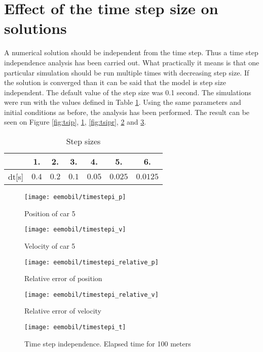 		\section{Effect of the time step size on solutions}
		A numerical solution should be independent from the time step. Thus a time step independence analysis has been carried out. What practically it means is that one particular simulation should be run multiple times with decreasing step size. If the solution is converged than it can be said that the model is step size independent. The default value of the step size was 0.1 second. The simulations were run with the values defined in Table \ref{tab:timestepsizes}.
		Using the same parameters and initial conditions as before, the analysis has been performed. The result can be seen on Figure \ref{fig:tsip}, \ref{fig:tsiv}, \ref{fig:tsipr}, \ref{fig:tsivr} and \ref{fig:tsit}.
		\begin{table}[ht]
			\begin{center}
				\begin{tabular}{ |c||c|c|c|c|c|c|}
					\hline
					&1. & 2. & 3. & 4. & 5. & 6.\\
					\hline
					dt[s]& $0.4$ & $0.2$ & $0.1$ & $0.05$ & $0.025$ & $0.0125$\\
					\hline
				\end{tabular}
			\end{center}
			\caption{Step sizes}
			\label{tab:timestepsizes}
		\end{table}
		\begin{figure}[ht]
			\centering
			\begin{minipage}{.5\textwidth}
				\centering
				\texttt{[image: eemobil/timestepi\_p]}
				\caption{Position of car 5}
				\label{fig:tsip}
			\end{minipage}\hfill
			\begin{minipage}{.5\textwidth}
				\centering
				\texttt{[image: eemobil/timestepi\_v]}
				\caption{Velocity of car 5}
				\label{fig:tsiv}
			\end{minipage}
		\end{figure}
		\begin{figure}
			\centering
			\begin{minipage}{.5\textwidth}
				\centering
				\texttt{[image: eemobil/timestepi\_relative\_p]}
				\caption{Relative error of position}
				\label{fig:tsipr}
			\end{minipage}\hfill
			\begin{minipage}{.5\textwidth}
				\centering
				\texttt{[image: eemobil/timestepi\_relative\_v]}
				\caption{Relative error of velocity}
				\label{fig:tsivr}
			\end{minipage}
		\end{figure}
		\begin{figure}
			\centering
			\texttt{[image: eemobil/timestepi\_t]}
			\caption{Time step independence. Elapsed time for 100 meters}
			\label{fig:tsit}
		\end{figure}
